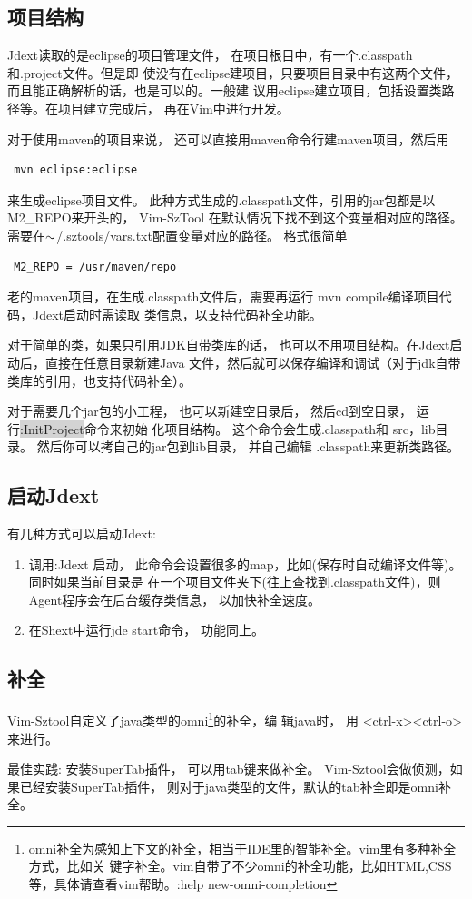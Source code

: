 \documentclass[oneside,openany]{book}
\begin{document}
\subsection{项目结构}
    Jdext读取的是eclipse的项目管理文件， 在项目根目中，有一个.classpath和.project文件。但是即
使没有在eclipse建项目，只要项目目录中有这两个文件，而且能正确解析的话，也是可以的。一般建
议用eclipse建立项目，包括设置类路径等。在项目建立完成后， 再在Vim中进行开发。

   对于使用maven的项目来说， 还可以直接用maven命令行建maven项目，然后用
  \begin{verbatim} mvn eclipse:eclipse \end{verbatim}
  来生成eclipse项目文件。 此种方式生成的.classpath文件，引用的jar包都是以M2\_REPO来开头的， Vim-SzTool
在默认情况下找不到这个变量相对应的路径。 需要在$\tiny{\sim}$/.sztools/vars.txt配置变量对应的路径。 格式很简单
  \begin{verbatim} M2_REPO = /usr/maven/repo \end{verbatim}

  老的maven项目，在生成.classpath文件后，需要再运行 mvn compile编译项目代码，Jdext启动时需读取
类信息，以支持代码补全功能。

   对于简单的类，如果只引用JDK自带类库的话， 也可以不用项目结构。在Jdext启动后，直接在任意目录新建Java
文件，然后就可以保存编译和调试（对于jdk自带类库的引用，也支持代码补全）。
  
   对于需要几个jar包的小工程， 也可以新建空目录后， 然后cd到空目录， 运行\colorbox{lightgray}{:InitProject}命令来初始
化项目结构。 这个命令会生成.classpath和 src，lib目录。 然后你可以拷自己的jar包到lib目录， 并自己编辑
.classpath来更新类路径。

\subsection{启动Jdext}
   有几种方式可以启动Jdext:
    \begin{enumerate}
      \item 调用:Jdext 启动， 此命令会设置很多的map，比如(保存时自动编译文件等)。 同时如果当前目录是
  在一个项目文件夹下(往上查找到.classpath文件)，则Agent程序会在后台缓存类信息， 以加快补全速度。
      \item 在Shext中运行jde start命令， 功能同上。
    \end{enumerate}

\subsection{补全}
    Vim-Sztool自定义了java类型的omni\footnote{omni补全为感知上下文的补全，相当于IDE里的智能补全。vim里有多种补全方式，比如关
    键字补全。vim自带了不少omni的补全功能，比如HTML,CSS等，具体请查看vim帮助。:help new-omni-completion }的补全，编
    辑java时， 用 <ctrl-x><ctrl-o> 来进行。
    \begin{mdframed}[style=BestPracticeFrame]
      最佳实践: 安装SuperTab插件， 可以用tab键来做补全。
      Vim-Sztool会做侦测，如果已经安装SuperTab插件， 则对于java类型的文件，默认的tab补全即是omni补全。
    \end{mdframed}
\end{document}
